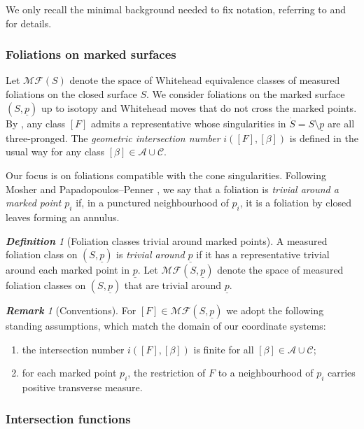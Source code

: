 \documentclass[11pt, letterpaper]{amsart}
\theoremstyle{definition}
\theoremstyle{remark}
\newtheorem{definition}[theorem]{\rm\bf Definition}
\newtheorem{remark}[theorem]{\rm\bf Remark}
\newcommand{\up}{\underline{p}}
\newcommand{\Sp}{(S,\up)}
\newcommand{\cMF}{\mathcal{MF}}
\newcommand{\cMFp}{\mathcal{MF} (S,\up)}
\newcommand{\cAC}{\mathcal{A} \cup \mathcal{C}}
\newcommand{\DEF}{} \newcommand{\WARN}{\textcolor{red}} \newcommand{\ALT}{\textcolor{brown}} \newcommand{\TODO}{\textcolor{teal}} %
\numberwithin{equation}{section}
\begin{document}
We only recall the minimal background needed to fix notation, referring to \cite{FLP12} and \cite{PP93} for details.

    \subsubsection{Foliations on marked surfaces}
\label{subsec:MF.surf.}

Let \(\cMF(S)\) denote the space of Whitehead equivalence classes of measured foliations on the closed surface \(S\).
We consider foliations on the marked surface \(\Sp\) up to isotopy and Whitehead moves that do not cross the marked points.
By \cite[Exp.~5]{FLP12}, any class \([F]\) admits a representative whose singularities in \(\dot{S} = S \setminus \up\) are all three-pronged.
The \emph{geometric intersection number} \(i([F], [\beta])\) is defined in the usual way for any class \([\beta] \in \cAC\).

Our focus is on foliations compatible with the cone singularities.
Following Mosher \cite{Mos88} and Papadopoulos--Penner \cite{PP93}, we say that a foliation is \DEF{\em trivial around a marked point \(p_i\)} if, in a punctured neighbourhood of \(p_i\), it is a foliation by closed leaves forming an annulus.   

\begin{definition}[Foliation classes trivial around marked points]
    \label{def:MF.surf.trivial.}
    A measured foliation class on $\Sp$ is \DEF{\em trivial around \(\up\)} if it has a representative trivial around each marked point in $\up$. Let \DEF{$\cMFp$} denote the space of measured foliation classes on \(\Sp\) that are trivial around \(\up\).
\end{definition}



\begin{remark}[Conventions]
\label{rem:MFp.convention}
For \([F]\in\cMFp\) we adopt the following standing assumptions, which match the domain of our coordinate systems:
\begin{enumerate}
  \item the intersection number \(i([F],[\beta])\) is finite for all \([\beta]\in\cAC\);
  \item for each marked point \(p_i\), the restriction of \(F\) to a neighbourhood of \(p_i\) carries positive transverse measure.
\end{enumerate}
\end{remark}
 \subsubsection{Intersection functions}
\label{subsubsec:inter.func.}
\end{document}
